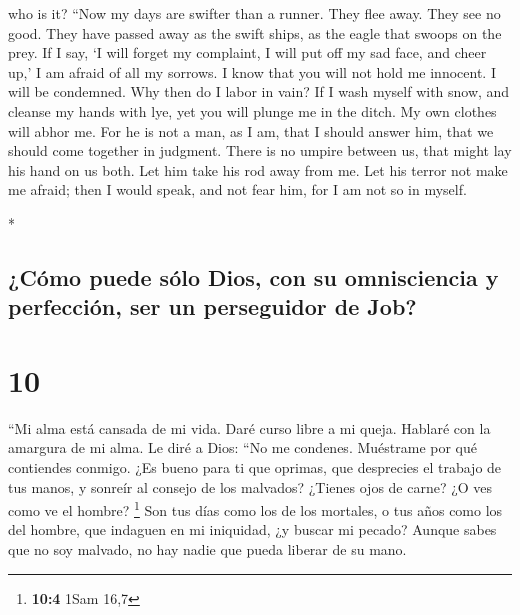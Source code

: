 \begin{paracol}{2}
\begin{otherlanguage}{english}
who is it?  ``Now my days are swifter than a runner. They
flee away. They see no good.  They have passed away as
the swift ships, as the eagle that swoops on the prey. 
If I say, `I will forget my complaint, I will put off my sad face, and
cheer up,'  I am afraid of all my sorrows. I know that
you will not hold me innocent.  I will be condemned. Why
then do I labor in vain?  If I wash myself with snow, and
cleanse my hands with lye,  yet you will plunge me in the
ditch. My own clothes will abhor me.  For he is not a
man, as I am, that I should answer him, that we should come together in
judgment.  There is no umpire between us, that might lay
his hand on us both.  Let him take his rod away from me.
Let his terror not make me afraid;  then I would speak,
and not fear him, for I am not so in myself.

\end{otherlanguage}

\switchcolumn[0]*

\hypertarget{cuxf3mo-puede-suxf3lo-dios-con-su-omnisciencia-y-perfecciuxf3n-ser-un-perseguidor-de-job}{%
\subsection{¿Cómo puede sólo Dios, con su omnisciencia y perfección, ser
un perseguidor de
Job?}\label{cuxf3mo-puede-suxf3lo-dios-con-su-omnisciencia-y-perfecciuxf3n-ser-un-perseguidor-de-job}}

\hypertarget{section-18}{%
\section{10}\label{section-18}}

 ``Mi alma está cansada de mi vida. Daré curso libre a mi
queja. Hablaré con la amargura de mi alma.  Le diré a
Dios: ``No me condenes. Muéstrame por qué contiendes conmigo.
 ¿Es bueno para ti que oprimas, que desprecies el trabajo
de tus manos, y sonreír al consejo de los malvados? 
¿Tienes ojos de carne? ¿O ves como ve el hombre? \footnote{\textbf{10:4}
  1Sam 16,7}  Son tus días como los de los mortales, o tus
años como los del hombre,  que indaguen en mi iniquidad,
¿y buscar mi pecado?  Aunque sabes que no soy malvado, no
hay nadie que pueda liberar de su mano.


\end{paracol}
